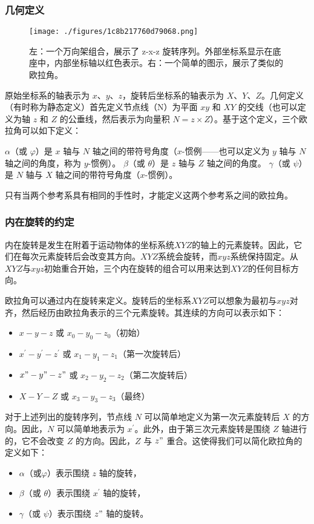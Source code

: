 \subsubsection{几何定义}  
\begin{figure}[ht]
\centering
\texttt{[image: ./figures/1c8b217760d79068.png]}
\caption{左：一个万向架组合，展示了 z-x-z 旋转序列。外部坐标系显示在底座中，内部坐标轴以红色表示。右：一个简单的图示，展示了类似的欧拉角。} \label{fig_OLJ_2}
\end{figure}
原始坐标系的轴表示为 \(x\)、\(y\)、\(z\)，旋转后坐标系的轴表示为 \(X\)、\(Y\)、\(Z\)。几何定义（有时称为静态定义）首先定义节点线（N）为平面 \(xy\) 和 \(XY\) 的交线（也可以定义为轴 \(z\) 和 \(Z\) 的公垂线，然后表示为向量积 \(N = z \times Z\)）。基于这个定义，三个欧拉角可以如下定义：

\(\alpha\)（或 \(\varphi\)）是 \(x\) 轴与 \(N\) 轴之间的带符号角度（\(x\)-惯例——也可以定义为 \(y\) 轴与 \(N\) 轴之间的角度，称为 \(y\)-惯例）。  
\(\beta\)（或 \(\theta\)）是 \(z\) 轴与 \(Z\) 轴之间的角度。  
\(\gamma\)（或 \(\psi\)）是 \(N\) 轴与 \(X\) 轴之间的带符号角度（\(x\)-惯例）。  

只有当两个参考系具有相同的手性时，才能定义这两个参考系之间的欧拉角。

\subsubsection{内在旋转的约定}
内在旋转是发生在附着于运动物体的坐标系统$XYZ$的轴上的元素旋转。因此，它们在每次元素旋转后会改变其方向。$XYZ$系统会旋转，而$xyz$系统保持固定。从$XYZ$与$xyz$初始重合开始，三个内在旋转的组合可以用来达到$XYZ$的任何目标方向。

欧拉角可以通过内在旋转来定义。旋转后的坐标系$XYZ$可以想象为最初与$xyz$对齐，然后经历由欧拉角表示的三个元素旋转。其连续的方向可以表示如下：
\begin{itemize}
\item $x-y-z$ 或 $x_0-y_0-z_0$（初始）  
\item $x^\prime-y^\prime-z^\prime$ 或 $x_1-y_1-z_1$（第一次旋转后）  
\item $x"-y"-z"$ 或 $x_2-y_2-z_2$（第二次旋转后）  
\item $X-Y-Z$ 或 $x_3-y_3-z_3$（最终）
\end{itemize}
对于上述列出的旋转序列，节点线 $N$ 可以简单地定义为第一次元素旋转后 $X$ 的方向。因此，$N$ 可以简单地表示为 $x^\prime$。此外，由于第三次元素旋转是围绕 $Z$ 轴进行的，它不会改变 $Z$ 的方向。因此，$Z$ 与 $z"$ 重合。这使得我们可以简化欧拉角的定义如下：
\begin{itemize}
\item $\alpha$（或$\varphi$）表示围绕 $z$ 轴的旋转，  
\item $\beta$（或 $\theta$）表示围绕 $x^\prime$ 轴的旋转，  
\item $\gamma$（或 $\psi$）表示围绕 $z"$ 轴的旋转。
\end{itemize}

